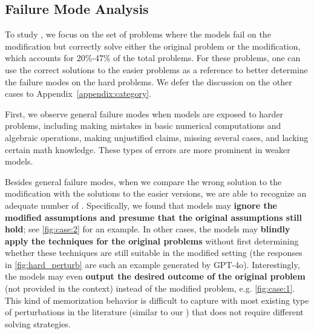 \subsection{Failure Mode Analysis}
\label{sec:failure:mode}





To study  , we focus on the set of problems where the models fail on the \HARD modification but correctly solve either the original problem or the \SAME modification, which accounts for 20\%-47\% of the total problems. For these problems, one can use the correct solutions to the easier problems as a reference to better determine the failure modes on the hard problems. We defer the discussion on the other cases to Appendix~\ref{appendix:category}.


First, we observe general failure modes when models are exposed to harder problems, including making mistakes in basic numerical computations and algebraic operations, making unjustified claims, missing several cases, and lacking certain math knowledge. These types of errors are more prominent in weaker models. 


Besides general failure modes, when we compare the wrong solution to the \HARD modification with the solutions to the easier versions, we are able to recognize an adequate number of . Specifically, we found that models may \textbf{ignore the modified assumptions and presume that the original assumptions still hold}; see \cref{fig:case:2} for an example. In other cases, the models may \textbf{blindly apply the techniques for the original problems} without first determining whether these techniques are still suitable in the modified setting (the responses in \cref{fig:hard_perturb} are such an example generated by GPT-4o). Interestingly, the models may even \textbf{output the desired outcome of the original problem} (not provided in the context) instead of the modified problem, e.g. \cref{fig:case:1}. This kind of memorization behavior is difficult to capture with most existing type of perturbations in the literature (similar to our \SAME) that does not require different solving strategies.





